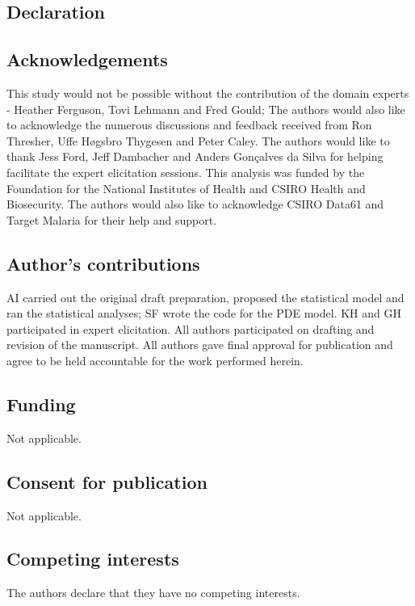 \documentclass[]{bmcart}
\begin{document}
\begin{backmatter}

\section*{Declaration}

\subsection*{Acknowledgements}
 This study would not be possible without the contribution of the domain experts - Heather Ferguson, Tovi Lehmann and Fred Gould; The authors would also like to acknowledge the numerous discussions and feedback received from Ron Thresher, Uffe Høgsbro Thygesen and Peter Caley. The authors would like to thank Jess Ford, Jeff Dambacher and Anders Gonçalves da Silva for helping facilitate the expert elicitation sessions. This analysis was funded by the Foundation for the National Institutes of Health and CSIRO Health and Biosecurity. The authors would also like to acknowledge CSIRO Data61 and Target Malaria for their help and support.


\subsection*{Author's contributions}
AI carried out the original draft preparation, proposed the statistical model and ran the statistical analyses; SF wrote the code for the PDE model. KH and GH participated in expert elicitation. All authors participated on drafting and revision of the manuscript. All authors gave final approval for publication and 
agree to be held accountable for the work performed herein.

\subsection*{Funding}
Not applicable.

\subsection*{Consent for publication}
Not applicable.

\subsection*{Competing interests}
The authors declare that they have no competing interests.


\end{backmatter}
\end{document}

